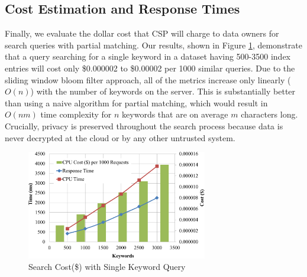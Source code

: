 \subsection{Cost Estimation and Response Times}

Finally, we evaluate the dollar cost that CSP will charge to data owners for search
queries with partial matching. 
Our results, shown in Figure \ref{fig:cost_single_query}, demonstrate that a query
searching for a single keyword in a dataset having 500-3500 index entries will cost only 
\$0.000002 to \$0.00002 per 1000 similar
queries. Due to the sliding window bloom filter approach, 
all of the metrics increase only linearly ($O(n)$) with the number
of keywords on the server. This is substantially better than using a naive algorithm 
for partial matching, which would result in $O(nm)$ time complexity 
for $n$ keywords that are on average $m$ characters long. Crucially,
privacy is preserved throughout the search process because data is never
decrypted at the cloud or by any other untrusted system.


\begin{figure}
  \centering
  \includegraphics[width=3.1in]{figures/cost_keywords_graph.png}
  \vspace{-10px}
  \caption{Search Cost(\$) with Single Keyword Query}
  \vspace{-10px}
  \label{fig:cost_single_query}
\end{figure}
